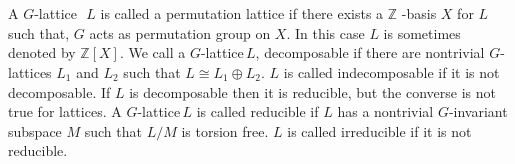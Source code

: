 \documentclass[a4paper, 14pt]{extarticle}
\theoremstyle{plain}
\theoremstyle{definition}
\newtheorem{definition}[theorem]{Definition}
\newcommand{\Z}{\ensuremath{\mathbb{Z}}}
\newcommand{\G}{G}
\newcommand{\glat}{$G$-lattice}
\begin{document}
\\
\\
A \glat \,\, $L$ is called a permutation lattice if there exists a $\Z$ -basis $X$ for $L$ such that, $G$ acts as permutation group on $X$. In this case $L$ is sometimes denoted by $\Z[X]$.
We call a \glat \,$L$, decomposable if there are nontrivial \glat s $L_1$ and $ L_2$ such that $ L\cong L_1 \oplus L_2$. $L$ is called indecomposable if it is not decomposable.
If $L$ is decomposable then it is reducible, but the converse is not true for lattices.
A \glat \,$L$ is called reducible if $L$ has a nontrivial $G$-invariant subspace $M$ such that $L/M$ is torsion free. $L$ is called irreducible if it is not reducible. 
\end{document}
